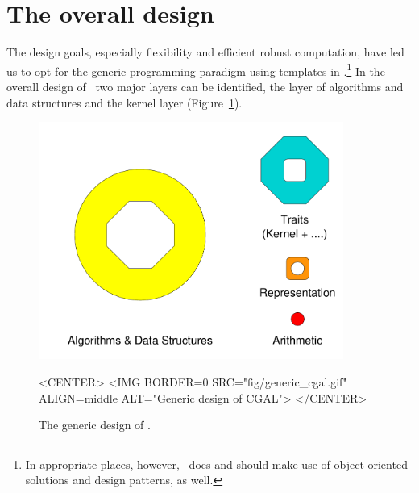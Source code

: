 
\section{The overall design\label{sec:overall_design}}

The design goals, especially flexibility and efficient robust 
computation, have led us to opt for the generic programming paradigm using 
templates in \CC.\footnote{In appropriate places, however, \cgal\ does 
and should make use of object-oriented solutions and design patterns, as well.}
In the overall design of \cgal\ two major layers can be identified, the
layer of algorithms and data structures and the kernel layer
(Figure~\ref{fig:genericCGAL}).

\begin{figure}
\begin{ccTexOnly}
\begin{center}
  \includegraphics[width=10cm]{Developers_manual/fig/generic_cgal}
\end{center}
\end{ccTexOnly}
\caption{The generic design of \cgal.
\label{fig:genericCGAL}}

\begin{ccHtmlOnly}
<CENTER>
<IMG BORDER=0 SRC="fig/generic_cgal.gif" 
  ALIGN=middle ALT="Generic design of CGAL">
</CENTER>
\end{ccHtmlOnly}
\end{figure}

